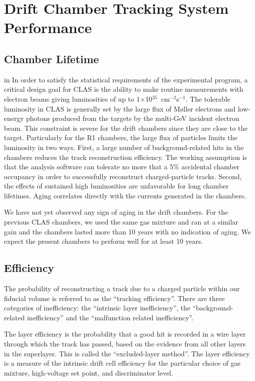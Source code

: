\section{Drift Chamber Tracking System Performance}


\subsection{Chamber Lifetime}
\label{choper}

 in 
In order to satisfy the statistical requirements of the experimental program, 
a critical design goal for CLAS is the ability to make routine measurements 
with electron beams giving luminosities of up to 
1$\times$10$^{35}$~cm$^{-2}$s$^{-1}$.  The tolerable luminosity in CLAS is 
generally set by the large flux of M{\o}ller electrons and low-energy photons 
produced from the targets by the multi-GeV incident electron beam.  This 
constraint is severe for the drift chambers since they are close to the 
target. Particularly for the R1 chambers, the large flux of 
particles limits the luminosity in two ways.  First, a large number of 
background-related hits in the chambers reduces the track reconstruction 
efficiency.  The working assumption is that the analysis software can tolerate 
no more that a 5$\%$ accidental chamber occupancy in order to successfully 
reconstruct charged-particle tracks.  Second, the effects of sustained high 
luminosities are unfavorable for long chamber lifetimes.  Aging correlates 
directly with the currents generated in the chambers.

We have not yet observed any sign of aging in the drift chambers.
For the previous CLAS chambers, we used the same gas mixture and ran at a
similar gain and the chambers lasted more than 10 years with no indication
of aging.  We expect the present
chambers to perform well for at least 10 years.


\subsection{Efficiency}

\hskip 0.15in
The probability of reconstructing a track due to a charged particle within
our fiducial volume is referred to as the ``tracking efficiency''.
There are three categories of inefficiency: the ``intrinsic layer inefficiency'',
the ``background-related inefficiency'' and the ``malfunction related 
inefficiency''.

The layer efficiency is the probability that a
good hit is recorded in a wire layer through which the track has passed, based on 
the evidence from all other layers in the superlayer.  This is called the 
``excluded-layer method''.  The layer efficiency is a measure of the intrinsic drift 
cell efficiency for the particular choice of gas mixture, high-voltage set point, and 
discriminator level.  

